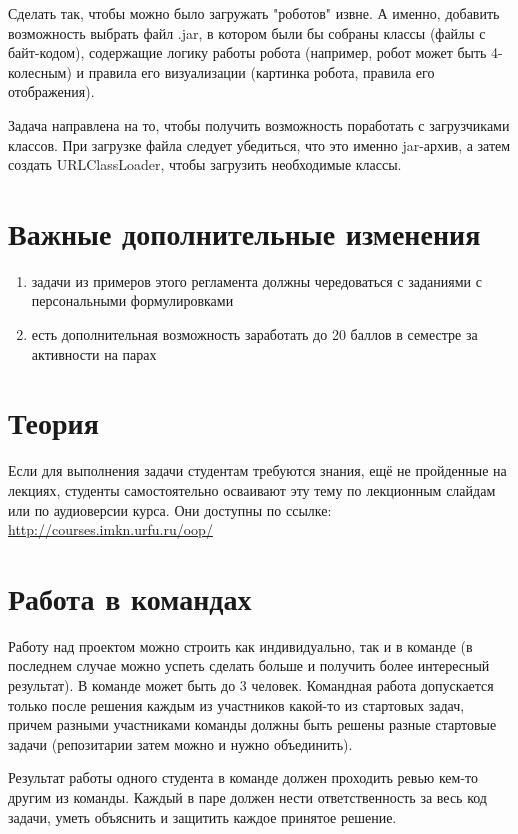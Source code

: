 \documentclass[a4paper,12pt]{article}
\begin{document}
Сделать так, чтобы можно было загружать "роботов" извне. А именно, добавить возможность выбрать файл .jar, в котором были бы собраны классы (файлы с байт-кодом), содержащие логику работы робота (например, робот может быть 4-колесным) и правила его визуализации (картинка робота, правила его отображения).

Задача направлена на то, чтобы получить возможность поработать с загрузчиками классов. При загрузке файла следует убедиться, что это именно jar-архив, а затем создать URLClassLoader, чтобы загрузить необходимые классы.

\section{Важные дополнительные изменения}

\begin{enumerate}
    \item задачи из примеров этого регламента должны чередоваться с заданиями с персональными формулировками
    \item есть дополнительная возможность заработать до 20 баллов в семестре за активности на парах
\end{enumerate}


\section{Теория}

Если для выполнения задачи студентам требуются знания, ещё не пройденные на лекциях, студенты самостоятельно осваивают эту тему по лекционным слайдам или по аудиоверсии курса. Они доступны по ссылке: \\
\url{http://courses.imkn.urfu.ru/oop/}

\section{Работа в командах}

Работу над проектом можно строить как индивидуально, так и в команде (в последнем случае можно успеть сделать больше и получить более интересный результат). В команде может быть до 3 человек. Командная работа допускается только после решения каждым из участников какой-то из стартовых задач, причем разными участниками команды должны быть решены разные стартовые задачи (репозитарии затем можно и нужно объединить).

Результат работы одного студента в команде должен проходить ревью кем-то другим из команды. Каждый в паре должен нести ответственность за весь код задачи, уметь объяснить и защитить каждое принятое решение.
\end{document}
